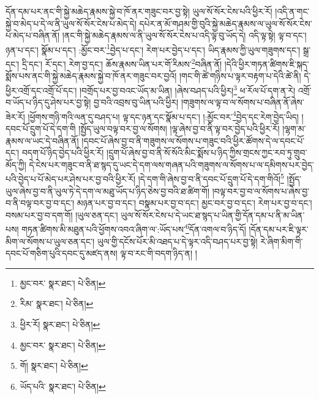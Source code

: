 དོན་དམ་པར་ནང་གི་སྐྱེ་མཆེད་རྣམས་སྐྱེ་བ་ཁོ་ནར་གཟུང་བར་བྱ་སྟེ། ཡུལ་སོ་སོར་ངེས་པའི་ཕྱིར་རོ། །འདི་ན་གང་སྐྱེ་བ་མེད་པ་དེ་ལ་ནི་ཡུལ་སོ་སོར་ངེས་པ་མེད་དེ། དཔེར་ན་མོ་གཤམ་གྱི་བུའི་སྐྱེ་མཆེད་རྣམས་ལ་ཡུལ་སོ་སོར་ངེས་པ་མེད་པ་བཞིན་ནོ། །ནང་གི་སྐྱེ་མཆེད་རྣམས་ལ་ནི་ཡུལ་སོ་སོར་ངེས་པ་འདི་ལྟ་བུ་ཡོད་དེ། འདི་ལྟ་སྟེ། ལྟ་བ་དང་། ཉན་པ་དང་། སྣོམ་པ་དང་། :མྱོང་བར་\footnote{མྱང་བར་  སྣར་ཐང་།  པེ་ཅིན། }བྱེད་པ་དང་། རེག་པར་བྱེད་པ་དང་། ཡིད་རྣམས་ཀྱི་ཡུལ་གཟུགས་དང་། སྒྲ་དང་། དྲི་དང་། རོ་དང་། རེག་བྱ་དང་། ཆོས་རྣམས་ཡིན་པར་གོ་རིམས་\footnote{རིམ་  སྣར་ཐང་།  པེ་ཅིན། }བཞིན་ནོ། །དེའི་ཕྱིར་གཏན་ཚིགས་ཇི་སྐད་སྨོས་པས་ནང་གི་སྐྱེ་མཆེད་རྣམས་སྐྱེ་བ་ཁོ་ནར་གཟུང་བར་བྱའོ། །གང་གི་ཚེ་གཉིས་པ་ལྟར་བརྟག་པ་དེའི་ཚེ་ནི། དེ་ཕྱིར་འགྲོ་དང་འགྲོ་པོ་དང་། །བགྲོད་པར་བྱ་བའང་ཡོད་མ་ཡིན། །ཞེས་བཤད་པའི་ཕྱིར།\footnote{ཕྱིར་རོ།  སྣར་ཐང་།  པེ་ཅིན། } ཕ་རོལ་པོ་དག་ན་རེ། འགྲོ་བ་ཡོད་པ་ཉིད་དུ་ཤེས་པར་བྱ་སྟེ། བྱ་བའི་འབྲས་བུ་ཡིན་པའི་ཕྱིར། །གཟུགས་ལ་ལྟ་བ་ལ་སོགས་པ་བཞིན་ནོ་ཞེས་ཟེར་རོ། །ཕྱོགས་གཉི་གའི་ལན་དུ་བཤད་པ། ལྟ་དང་ཉན་དང་སྣོམ་པ་དང་། །:མྱོང་བར་\footnote{མྱང་བར་  སྣར་ཐང་།  པེ་ཅིན། }བྱེད་དང་རེག་བྱེད་ཡིད། །དབང་པོ་དྲུག་པོ་དེ་དག་གི །སྤྱོད་ཡུལ་བལྟ་བར་བྱ་ལ་སོགས། །ལྟ་ཞེས་བྱ་བ་ནི་ལྟ་བར་བྱེད་པའི་ཕྱིར་རོ། །ལྷག་མ་རྣམས་ལ་ཡང་དེ་བཞིན་ནོ། །དབང་པོ་ཞེས་བྱ་བ་ནི་གཟུགས་ལ་སོགས་པ་གཟུང་བའི་ཕྱིར་ཚོགས་དེ་ལ་དབང་པོ་དང་། བདག་པོ་ཉིད་བྱེད་པའི་ཕྱིར་རོ། །དྲུག་པོ་ཞེས་བྱ་བ་ནི་སོ་སོའི་མིང་སྨོས་པ་ཉིད་ཀྱིས་གྲངས་ཀྱང་རབ་ཏུ་གྲུབ་མོད་ཀྱི། དེ་ངེས་པར་གཟུང་བ་ནི་ཐ་སྙད་དུ་ཡང་དེ་དག་ལས་གཞན་པའི་གཟུགས་ལ་སོགས་པ་ལ་དམིགས་པར་བྱེད་པའི་བྱེད་པ་པོ་མེད་པར་ཤེས་པར་བྱ་བའི་ཕྱིར་རོ། །དེ་དག་གི་ཞེས་བྱ་བ་ནི་དབང་པོ་དྲུག་པོ་དེ་དག་གིའོ།\footnote{གོ།  སྣར་ཐང་།  པེ་ཅིན། } །སྤྱོད་ཡུལ་ཞེས་བྱ་བ་ནི་ཡུལ་ཏེ་དེ་དག་ལ་མཐུ་ཡོད་པ་ཉིད་ཅེས་བྱ་བའི་ཐ་ཚིག་གོ། །བལྟ་བར་བྱ་བ་ལ་སོགས་པ་ཞེས་བྱ་བ་ནི་བལྟ་བར་བྱ་བ་དང་། མཉན་པར་བྱ་བ་དང་། བསྣམ་པར་བྱ་བ་དང་། མྱང་བར་བྱ་བ་དང་། རེག་པར་བྱ་བ་དང་། བསམ་པར་བྱ་བ་དག་གོ། །ཡུལ་ཅན་དང་། ཡུལ་སོ་སོར་ངེས་པ་དེ་ཡང་ཐ་སྙད་པ་ཡིན་གྱི་དོན་དམ་པ་ནི་མ་ཡིན་པས། གཏན་ཚིགས་མི་མཐུན་པའི་ཕྱོགས་འབའ་ཞིག་ལ་:ཡོད་པས་\footnote{ཡོད་པའི་  སྣར་ཐང་།  པེ་ཅིན། }དོན་འགལ་བ་ཉིད་དོ། །དོན་དམ་པར་ཇི་ལྟར་མིག་ལ་སོགས་པ་ཡུལ་ཅན་དང་། ཡུལ་གྱི་དངོས་པོར་མི་འཐད་པ་དེ་ལྟར་འདི་བཤད་པར་བྱ་སྟེ། རེ་ཞིག་མིག་གི་དབང་པོ་གཅིག་པུའི་དབང་དུ་མཛད་ནས། ལྟ་བ་རང་གི་བདག་ཉིད་ན། །
